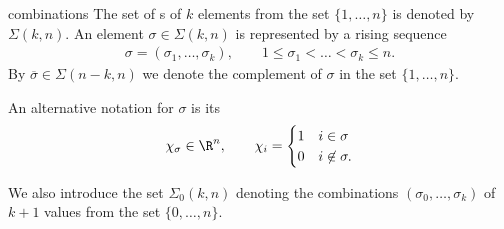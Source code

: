 \begin{Notation}{combinations}
  The set of s of $k$ elements from the set
  $\{1,\dots,n\}$ is denoted by $\Sigma(k,n)$. An element
  $\sigma\in\Sigma(k,n)$ is represented by a rising sequence
  \begin{gather}
    \sigma = (\sigma_1,\dots,\sigma_k),
    \qquad
    1\le \sigma_1 < \dots < \sigma_k \le n.
  \end{gather}
  By $\overline\sigma \in\Sigma(n-k,n)$ we denote the complement of
  $\sigma$ in the set $\{1,\dots,n\}$.

  An alternative notation for $\sigma$ is its 
  \begin{gather}
    \chi_\sigma\in \R^n,
    \qquad
    \chi_i =
    \begin{cases}
      1 & i\in\sigma\\
      0& i\not\in\sigma.
    \end{cases}
  \end{gather}
  
  We also introduce the set $\Sigma_0(k,n)$ denoting the combinations
  $(\sigma_0,\dots,\sigma_k)$ of $k+1$ values from the set
  $\{0,\dots,n\}$.
\end{Notation}
